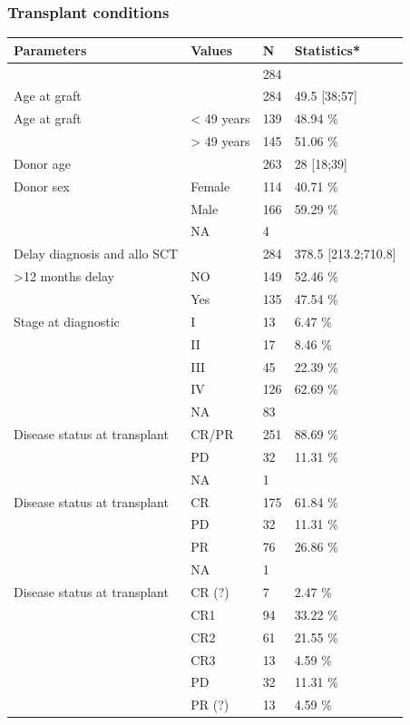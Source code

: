 \documentclass[a4paper,11pt] {article}
\begin{document}
 \subsubsection{Transplant conditions}
\begin{longtable}{llll}
  \hline
Parameters & Values & N & Statistics* \\ 
  \hline
 &  & 284 &  \\ 
  Age at graft &  & 284 & 49.5 [38;57] \\ 
  Age at graft & < 49 years & 139 & 48.94 \% \\ 
   & > 49 years & 145 & 51.06 \% \\ 
  Donor age &  & 263 & 28 [18;39] \\ 
  Donor sex & Female & 114 & 40.71 \% \\ 
   & Male & 166 & 59.29 \% \\ 
   & NA & 4 &  \\ 
  Delay diagnosis and allo SCT &  & 284 & 378.5 [213.2;710.8] \\ 
  >12 months delay & NO & 149 & 52.46 \% \\ 
   & Yes & 135 & 47.54 \% \\ 
  Stage at diagnostic & I & 13 & 6.47 \% \\ 
   & II & 17 & 8.46 \% \\ 
   & III & 45 & 22.39 \% \\ 
   & IV & 126 & 62.69 \% \\ 
   & NA & 83 &  \\ 
  Disease status at transplant & CR/PR & 251 & 88.69 \% \\ 
   & PD & 32 & 11.31 \% \\ 
   & NA & 1 &  \\ 
  Disease status at transplant & CR & 175 & 61.84 \% \\ 
   & PD & 32 & 11.31 \% \\ 
   & PR & 76 & 26.86 \% \\ 
   & NA & 1 &  \\ 
  Disease status at transplant & CR (?) & 7 & 2.47 \% \\ 
   & CR1 & 94 & 33.22 \% \\ 
   & CR2 & 61 & 21.55 \% \\ 
   & CR3 & 13 & 4.59 \% \\ 
   & PD & 32 & 11.31 \% \\ 
   & PR (?) & 13 & 4.59 \% \\ 

\end{longtable}
\end{document}
